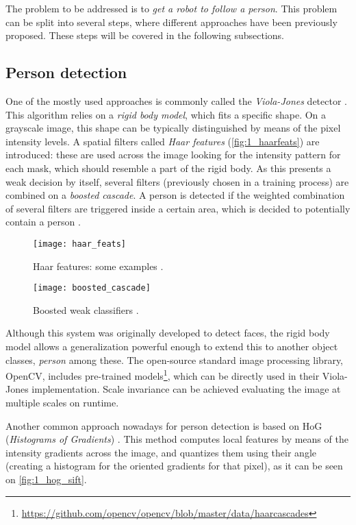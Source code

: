	The problem to be addressed is to \textit{get a robot to follow a person}. This problem can be split into several steps, where different approaches have been previously proposed. These steps will be covered in the following subsections.
	
\subsection{Person detection}


One of the mostly used approaches is commonly called the \textit{Viola-Jones} detector \cite{violajones}. This algorithm relies on a \textit{rigid body model}, which fits a specific shape. On a grayscale image, this shape can be typically distinguished by means of the pixel intensity levels. A spatial filters called \textit{Haar features} (\autoref{fig:1_haarfeats}) are introduced: these are used across the image looking for the intensity pattern for each mask, which should resemble a part of the rigid body. As this presents a weak decision by itself, several filters (previously chosen in a training process) are combined on a \textit{boosted cascade}. A person is detected if the weighted combination of several filters are triggered inside a certain area, which is decided to potentially contain a person \cite{diapos_cv_clasif}.

\begin{figure}[h]
	\centering
	\texttt{[image: haar\_feats]}
	\caption{Haar features: some examples \cite{diapos_cv_clasif}.}
	\label{fig:1_haarfeats}
\end{figure}

\begin{figure}[h]
	\centering
	\texttt{[image: boosted\_cascade]}
	\caption{Boosted weak classifiers \cite{diapos_cv_clasif}.}
	\label{fig:1_violajones_boost}
\end{figure}

Although this system was originally developed to detect faces, the rigid body model allows a generalization powerful enough to extend this to another object classes, \textit{person} among these. The open-source standard image processing library, OpenCV, includes pre-trained models\footnote{\url{https://github.com/opencv/opencv/blob/master/data/haarcascades}}, which can be directly used in their Viola-Jones implementation. Scale invariance can be achieved evaluating the image at multiple scales on runtime.


Another common approach nowadays for person detection is based on HoG (\textit{Histograms of Gradients}) \cite{hog_detection}. This method computes local features by means of the intensity gradients across the image, and quantizes them using their angle (creating a histogram for the oriented gradients for that pixel), as it can be seen on \autoref{fig:1_hog_sift}.\\


